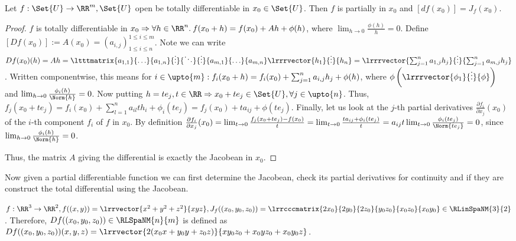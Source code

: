 \begin{thm}
  Let $f:\Set{U}\to\RR^m, \Set{U}$ open be totally differentiable in $x_0\in\Set{U}$. Then $f$ is partially in $x_0$ and $\left[df(x_0)\right]=J_f(x_0)$. 
\end{thm}
\begin{proof}
  $f$ is totally differentiable in $x_0\Rightarrow \forall h\in \RR^n.\:f(x_0+h)=f(x_0)+Ah+\phi(h)$, where $\lim_{h\to 0}\frac{\phi(h)}{h}=0$. Define $\left[Df(x_0)\right]:=A(x_0)=(a_{i,j})_{1\leq i\leq n}^{1\leq i \leq m}$. Note we can write $Df(x_0)(h)=Ah=\ltttmatrix{a_{1,1}}{\ldots}{a_{1,n}}{\vdots}{\ddots}{\vdots}{a_{m,1}}{\ldots}{a_{m,n}}\lrrrvector{h_1}{\vdots}{h_n}=\lrrrvector{\sum_{j=1}^{n}a_{1,j}h_j}{\vdots}{\sum_{j=1}^{n}a_{m,j}h_j}$. Written componentwise, this means for $i\in\upto{m}: f_i(x_0+h)=f_i(x_0)+\sum_{j=1}^{n}a_{i,j}h_j+\phi(h)$, where $\phi\left(\lrrrvector{\phi_1}{\vdots}{\phi}\right)$ and $\lim_{h\to 0}\frac{\phi_i(h)}{\Norm{h}}=0$. Now putting $h=te_j, t\in\RR\Rightarrow x_0+te_j\in\Set{U}, \forall j\in\upto{n}$. Thus, $f_j(x_0+te_j)=f_i(x_0)+\sum_{l=1}^{n}a_{il}th_i+\phi_i(te_j)=f_j(x_0)+ta_{ij}+\phi(te_j)$. Finally, let us look at the $j$-th partial derivatives $\frac{\partial f_i}{\partial x_j}(x_0)$ of the $i$-th component $f_i$ of $f$ in $x_0$. By definition $\frac{\partial f_i}{\partial x_j}(x_0)=\lim_{t\to 0}\frac{f_j(x_0+te_j)-f(x_0)}{t}=\lim_{t\to 0}\frac{ta_{ij}+\phi_i(te_j)}{t}=a_{ij}t\lim_{t\to 0}\frac{\phi_i(te_j)}{\Norm{te_j}}=0$, since $\lim_{h\to 0}\frac{\phi_i(h)}{\Norm{h}}=0$. 
  
  Thus, the matrix $A$ giving the differential is exactly the Jacobean in $x_0$. 
\end{proof}
\begin{thm}
  
\end{thm}
\begin{rem}
  Now given a partial differentiable function we can first determine the Jacobean, check its partial derivatives for continuity and if they are construct the total differential using the Jacobean. 
\end{rem}
\begin{exam}
  $f:\RR^3\to\RR^2, f((x,y))=\lrrvector{x^2+y^2+z^2}{xyz}, J_f((x_0,y_0, z_0))=\lrrcccmatrix{2x_0}{2y_0}{2z_0}{y_0z_0}{x_0z_0}{x_0y_0}\in\RLinSpaNM{3}{2}$. Therefore, $Df((x_0, y_0, z_0))\in\RLSpaNM{n}{m}$ is defined as $Df((x_0,y_0,z_0))(x,y,z)=\lrrvector{2(x_0x+y_0y+z_0z)}{xy_0z_0+x_0yz_0+x_0y_0z}$. 
\end{exam}
